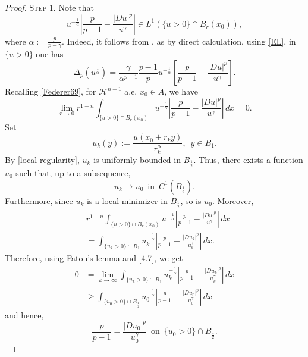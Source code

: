 \documentclass[11pt, reqno]{amsart}
\numberwithin{equation}{section}
\numberwithin{theorem}{section}
\numberwithin{lemma}{section}
\numberwithin{corollary}{section}
\numberwithin{remark}{section}
\numberwithin{proposition}{section}
\numberwithin{definition}{section}
\def \H {\mathcal{H}^{n-1}}
\begin{document}
\begin{proof}
\textsc{Step 1.} Note that
\begin{equation*}\label{integrability}
    u^{-\frac{1}{\alpha}}\left|\frac{p}{p-1}-\frac{|Du|^p}{u^\gamma}\right|\in L^{1}\left(\{u>0\}\cap B_r(x_0)\right),
\end{equation*}
where $\alpha:=\frac{p}{p-\gamma}$. Indeed, it follows from , as by direct calculation, using \eqref{EL}, in $\{u>0\}$ one has
\begin{equation*}
    \Delta_p(u^{\frac{1}{\alpha}})=\frac{\gamma}{\alpha^{p-1}}\frac{p-1}{p}u^{-\frac{1}{\alpha}}\left[\frac{p}{p-1}-\frac{|Du|^p}{u^\gamma}\right].
\end{equation*}
Recalling \eqref{Federer69}, for $\H$ a.e. $x_0\in A$, we have
\begin{equation}\label{4.7}
    \lim_{r\to0}r^{1-n}\int_{\{u>0\}\cap B_r(x_0)} u^{-\frac{1}{\alpha}}\left|\frac{p}{p-1}-\frac{|Du|^p}{u^\gamma}\right|\,dx=0.
\end{equation}
	Set
	$$
	u_k(y):=\frac{u(x_0+r_ky)}{r_k^\alpha},\,\,\,y\in B_1.
	$$
    By \eqref{local regularity}, $u_k$ is uniformly bounded in $B_{\frac{1}{2}}$. Thus, there exists a function $u_0$ such that, up to a subsequence, 
    \begin{equation*}\label{strong convergence}
        u_k\to u_0\,\,\,\text{in}\,\,\,C^1(B_{\frac{1}{2}}). 
    \end{equation*}
    Furthermore, since $u_k$ is a local minimizer in $B_{\frac{1}{2}}$, so is $u_0$. Moreover,
    \begin{align*}
        &r^{1-n}\int_{\{u>0\}\cap B_r(x_0)} u^{-\frac{1}{\alpha}}\left|\frac{p}{p-1}-\frac{|Du|^p}{u^\gamma}\right|\,dx\\
        &=\int_{\{u_k>0\}\cap B_1} u_k^{-\frac{1}{\alpha}}\left|\frac{p}{p-1}-\frac{|Du_k|^p}{u_k^\gamma}\right|\,dx.
    \end{align*}
    Therefore, using Fatou's lemma and \eqref{4.7}, we get
    \begin{align*}
        0&=\lim_{k\to\infty}\int_{\{u_k>0\}\cap B_1} u_k^{-\frac{1}{\alpha}}\left|\frac{p}{p-1}-\frac{|Du_k|^p}{u_k^\gamma}\right|\,dx\\
        &\ge\int_{\{u_0>0\}\cap B_{\frac{1}{2}}} u_0^{-\frac{1}{\alpha}}\left|\frac{p}{p-1}-\frac{|Du_0|^p}{u_0^\gamma}\right|\,dx
    \end{align*}
    and hence,
    \begin{equation}\label{3.9}
        \frac{p}{p-1}=\frac{|Du_0|^p}{u_0^\gamma}\,\,\,\text{on}\,\,\,\{u_0>0\}\cap B_{\frac{1}{2}}.

\end{equation}
\end{proof}
\end{document}
